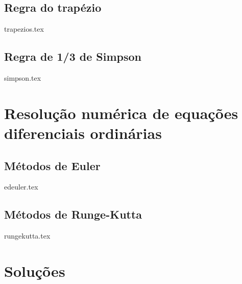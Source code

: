 \documentclass[10pt,a4paper]{report}
\theoremstyle{definition}
\begin{document}
	\section{Regra do trapézio}
	{trapezios.tex}
	\section{Regra de 1/3 de Simpson}
	{simpson.tex}
\chapter{Resolução numérica de equações diferenciais ordinárias}
	\section{Métodos de Euler}
	{edeuler.tex}	
	\section{Métodos de Runge-Kutta}
	{rungekutta.tex}




\appendix
\chapter{Soluções}

\end{document}
